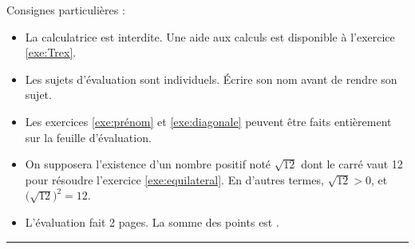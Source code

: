 

\SetDate[15/10/2025]
\reversemarginpar
\setlength{\marginparsep}{.5cm}


\pagestyle{fancy}
\fancyhead[R]{\today}

\null\vspace{-30pt}
Consignes particulières : 
\begin{itemize}[label=$\bullet$]
	\item 
	La calculatrice est {interdite}. Une aide aux calculs est disponible à l'exercice \ref{exe:Trex}.
	\item
	Les sujets d'évaluation sont individuels. Écrire son nom avant de rendre son sujet.
	\item
	Les exercices \ref{exe:prénom} et \ref{exe:diagonale} peuvent être faits entièrement sur la feuille d'évaluation. 
	\item 
	On supposera l'existence d'un nombre positif noté $\sqrt{12}$ dont le carré vaut 12 pour résoudre l'exercice \ref{exe:equilateral}.
	En d'autres termes, $\sqrt{12} > 0$, et $\bigl(\sqrt{12}\bigr)^2 = 12$.
	\item
	L'évaluation fait 2 pages. La somme des points est .
\end{itemize}

\marginpar{[pts]}
\hrule











\newpage












